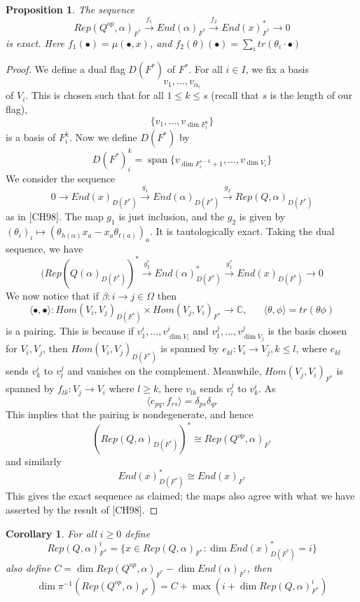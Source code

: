 \documentclass[12pt]{amsart}
\theoremstyle{plain}
\newtheorem{prop}[thm]{Proposition}
\newtheorem{cor}[thm]{Corollary}
\theoremstyle{definition}
\theoremstyle{remark}
\begin{document}
\begin{prop} The sequence 
$$Rep(Q^{op},\alpha)_{F^*}\overset{f_1}{\to} End(\alpha)_{F^*}\overset{f_2}{\to} End(x)_{F^*}^{*}\to 0$$
is exact. Here $f_1(\bullet)=\mu(\bullet,x)$, and $f_2(\theta)(\bullet)=\sum_itr(\theta_i\cdot\bullet)$
\end{prop}
\begin{proof}
\selectfont
We define a dual flag $D(F^*)$ of $F^*$. For all $i\in I$, we fix a basis 
$$v_1,...,v_{\alpha_i}$$
of $V_i$. This is chosen such that for all $1\leq k\leq s$ (recall that $s$ is the length of our flag), 
$$\{v_1,...,v_{\dim F_i^k}\}$$
is a basis of $F_i^k$. Now we define $D(F^*)$ by
$$D(F^*)^k_{i}=\operatorname{span}\{v_{\dim F_{i}^{s-k}+1},...,v_{\dim V_i}\}$$
We consider the sequence 
$$0\to End(x)_{D(F^*)}\overset{g_1}{\to} End(\alpha)_{D(F^*)}\overset{g_2}{\to} Rep(Q,\alpha)_{D(F^*)}$$
as in [CH98]. The map $g_1$ is just inclusion, and the $g_2$ is given by 
$(\theta_i)_i\mapsto (\theta_{h(\alpha)}x_a-x_a\theta_{t(a)})_a$. It is tautologically exact. Taking the dual sequence, we have 
$$(Rep(Q(\alpha)_{D(F^*)})^*\overset{g_2^*}{\to}End(\alpha)_{D(F^*)}^{*}\overset{g_1^*}{\to}End(x)_{D(F^*)}\to 0$$
We now notice that if $\beta:i\to j\in\Omega$ then
$$\langle\bullet,\bullet\rangle:Hom(V_i,V_j)_{D(F^*)}\times Hom(V_j,V_i)_{F^*}\to \mathbb C,\hspace{20pt}\langle\theta,\phi\rangle= tr(\theta\phi)$$
is a pairing. This is because if $v_1^i,...,v_{\dim V_i}^i$ and $v_1^j,...,v_{\dim V_j}^j$ is the basis chosen for $V_i,V_j$, then $Hom(V_i,V_j)_{D(F^*)}$ is spanned by $e_{kl}:V_i\to V_j,k\leq l$, where $e_{kl}$ sends $v_k^i$ to $v_l^j$ and vanishes on the complement. Meanwhile, $Hom(V_j,V_i)_{F^*}$ is spanned by $f_{lk}:V_j\to V_i$ where $l\geq k$, here $v_{lk}$ sends $v_l^j$ to $v_k^i$. As 
$$\langle e_{pq},f_{rs}\rangle=\delta_{ps}\delta_{qr}$$
This implies that the pairing is nondegenerate, and hence
$$(Rep(Q,\alpha)_{D(F^*)})^*\cong Rep(Q^{op},\alpha)_{F^*}$$
and similarly $$End(x)_{D(F^*)}^*\cong End(x)_{F^*}$$
This gives the exact sequence as claimed; the maps also agree with what we have asserted by the result of [CH98].
\end{proof}
\begin{cor} For all $i\geq 0$ define
$$Rep(Q,\alpha)_{F^*}^i=\{x\in Rep(Q,\alpha)_{F^*}:\dim End(x)_{D(F^*)}^*=i\}$$
also define $C=\dim Rep(Q^{op},\alpha)_{F^*}-\dim End(\alpha)_{F^*}$, then 
$$\dim \pi^{-1}(Rep(Q^{op},\alpha)_{F^*})=C+\max(i+\dim Rep(Q,\alpha)_{F^*}^i)$$
\end{cor}
\end{document}
